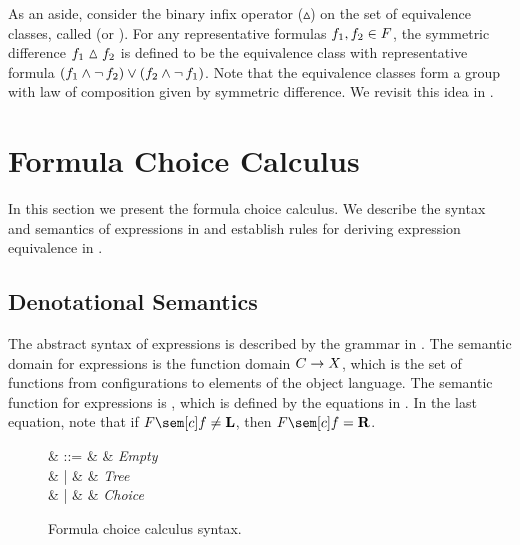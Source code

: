 As an aside, consider the binary infix operator ($\vartriangle$) on the set of equivalence classes, called  (or ).
For any representative formulas $\color{black}f_1, \color{black}f_2 \in \color{black}F$, the symmetric difference $\color{black}f_1 \vartriangle \color{black}f_2$ is defined to be the equivalence class with representative formula $(\color{black}f_1 \land \operatorname{\lnot} \color{black}f_2) \lor (\color{black}f_2 \land \operatorname{\lnot} \color{black}f_1)$.
Note that the equivalence classes form a group with law of composition given by symmetric difference.
We revisit this idea in .

\section{Formula Choice Calculus}
\label{sec:fcc}

\renewcommand*{\dimMeta}{\fE}

In this section we present the formula choice calculus.
We describe the syntax and semantics of expressions in  and establish rules for deriving expression equivalence in .

\subsection{Denotational Semantics}
\label{sec:fccsem}

The abstract syntax of expressions is described by the grammar in .
The semantic domain for expressions is the function domain $\color{black}C \to \color{black}X$, which is the set of functions from configurations to elements of the object language.
The semantic function for expressions is \ccSem{\cdot}, which is defined by the equations in .
In the last equation, note that if $\fSem[\cE]{\fE} \ne \tagL$, then $\fSem[\cE]{\fE} = \tagR$.

\begin{figure}[H]
  \onehalfspacing
  \begin{syntax}
    \ccE \in \ccS
    & ::= & \objEmpty & \textit{Empty} \\
    & | & \tr{\ccE, \ccE} & \textit{Tree} \\
    & | & \chc{\ccE, \ccE} & \textit{Choice}
  \end{syntax}
  \caption{Formula choice calculus syntax.}
  \label{fig:fccsyn}
\end{figure}

